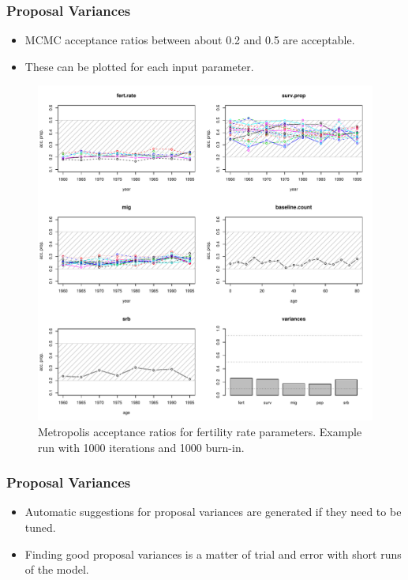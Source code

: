 \documentclass[smaller,compress,table]{beamer}
\begin{document}
\begin{frame}
  \frametitle{Proposal Variances}
  \begin{itemize}
  \item MCMC acceptance ratios between about 0.2 and 0.5 are acceptable.
  \item These can be plotted for each input parameter.
  \end{itemize}
  \begin{figure}
    \centering
    \includegraphics[width=0.8\linewidth,viewport=0 216 648 648,clip=true]{../results/Thai_20130612srb10_accProps.pdf}
    \caption{Metropolis acceptance ratios for fertility rate parameters. Example run with 1000 iterations and 1000 burn-in.}
  \end{figure}
\end{frame}


\begin{frame}[fragile]
  \frametitle{Proposal Variances}
  \begin{itemize}
  \item Automatic suggestions for proposal variances are generated if they need to be tuned.
  \item Finding good proposal variances is a matter of trial and error with short runs of the model.
  \end{itemize}
\begin{Schunk}
\end{Schunk}
\end{frame}
\end{document}
